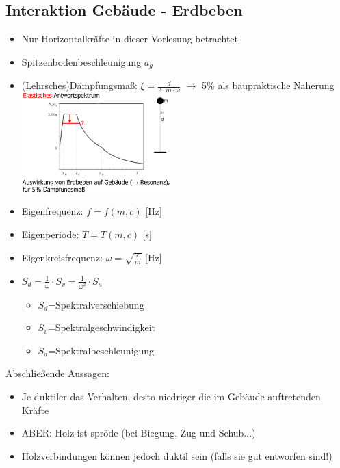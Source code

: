 \documentclass[fleqn,twoside]{article}
\begin{document}
    \subsection{Interaktion Gebäude - Erdbeben}
        \begin{itemize}
            \item Nur Horizontalkräfte in dieser Vorlesung betrachtet
            \item Spitzenbodenbeschleunigung $a_g$ 
            \item (Lehrsches)Dämpfungsmaß: $\xi=\frac{d}{2\cdot m \cdot \omega}$ $\rightarrow$ 5\% als baupraktische Näherung\\
                \includegraphics[width=0.45\textwidth]{Grafiken/Erdbeben/Elastisches Antwortspektrum.png}
            \item Eigenfrequenz: $f=f(m,c)$ [Hz]
            \item Eigenperiode: $T=T(m,c)$ [s]
            \item Eigenkreisfrequenz: $\omega = \sqrt{\frac{c}{m}}$ [Hz]
            \item $S_d = \frac{1}{\omega}\cdot S_v = \frac{1}{\omega^2}\cdot S_a$
                \begin{itemize}
                    \item $S_d$=Spektralverschiebung
                    \item $S_v$=Spektralgeschwindigkeit
                    \item $S_a$=Spektralbeschleunigung
                \end{itemize}
        \end{itemize}

        Abschließende Aussagen:
        \begin{itemize}
            \item Je duktiler das Verhalten, desto niedriger die im Gebäude auftretenden Kräfte
            \item ABER: Holz ist spröde (bei Biegung, Zug und Schub...)
            \item Holzverbindungen können jedoch duktil sein (falls sie gut entworfen sind!)
        \end{itemize}
\end{document}
